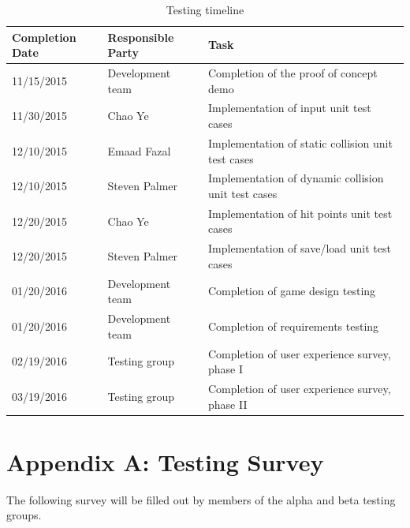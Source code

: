 \documentclass[12pt, titlepage]{article}
\begin{document}
\begin{table}[ht]
\caption{Testing timeline} \label{tab:timeline}
\begin{tabularx}{\textwidth}{p{2.5cm}p{3cm}X}
\toprule {\bf Completion Date} & {\bf Responsible Party} & {\bf Task}\\
\midrule
11/15/2015 & Development team & Completion of the proof of concept demo\\[0.3\baselineskip]
11/30/2015 & Chao Ye & Implementation of input unit test cases\\[0.3\baselineskip]
12/10/2015 & Emaad Fazal & Implementation of static collision unit test cases\\[0.3\baselineskip]
12/10/2015 & Steven Palmer & Implementation of dynamic collision unit test cases\\[0.3\baselineskip]
12/20/2015 & Chao Ye & Implementation of hit points unit test cases\\[0.3\baselineskip]
12/20/2015 & Steven Palmer & Implementation of save/load unit test cases\\[0.3\baselineskip]
01/20/2016 & Development team & Completion of game design testing\\[0.3\baselineskip]
01/20/2016 & Development team & Completion of requirements testing\\[0.3\baselineskip]
02/19/2016 & Testing group & Completion of user experience survey, phase I \\[0.3\baselineskip]
03/19/2016 & Testing group & Completion of user experience survey, phase II\\
\bottomrule
\end{tabularx}
\end{table}



\newpage
\section{Appendix A:  Testing Survey}
\label{sec:survey}

The following survey will be filled out by members of the alpha and beta testing groups.
\end{document}

